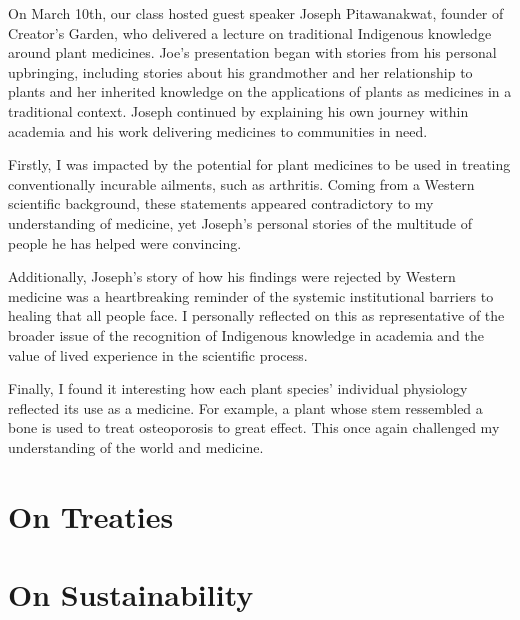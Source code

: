 \documentclass{report}
\begin{document}
\hspace{24pt} On March 10th, our class hosted guest speaker Joseph Pitawanakwat, founder of Creator's Garden, who delivered a lecture on traditional Indigenous knowledge around plant medicines.
Joe's presentation began with stories from his personal upbringing, including stories about his grandmother and her relationship to plants and her inherited knowledge on the applications of plants as medicines in a traditional context. 
Joseph continued by explaining his own journey within academia and his work delivering medicines to communities in need.

\hspace{24pt} Firstly, I was impacted by the potential for plant medicines to be used in treating conventionally incurable ailments, such as arthritis. Coming from a Western scientific background, these statements appeared contradictory to my understanding of medicine, yet Joseph's personal stories of the multitude of people he has helped were convincing.

\hspace{24pt} Additionally, Joseph's story of how his findings were rejected by Western medicine was a heartbreaking reminder of the systemic institutional barriers to healing that all people face. I personally reflected on this as representative of the broader issue of the recognition of Indigenous knowledge in academia and the value of lived experience in the scientific process.

\hspace{24pt} Finally, I found it interesting how each plant species' individual physiology reflected its use as a medicine. For example, a plant whose stem ressembled a bone is used to treat osteoporosis to great effect. This once again challenged my understanding of the world and medicine.

\clearpage

\section{On Treaties}


\clearpage

\section{On Sustainability}
\end{document}
